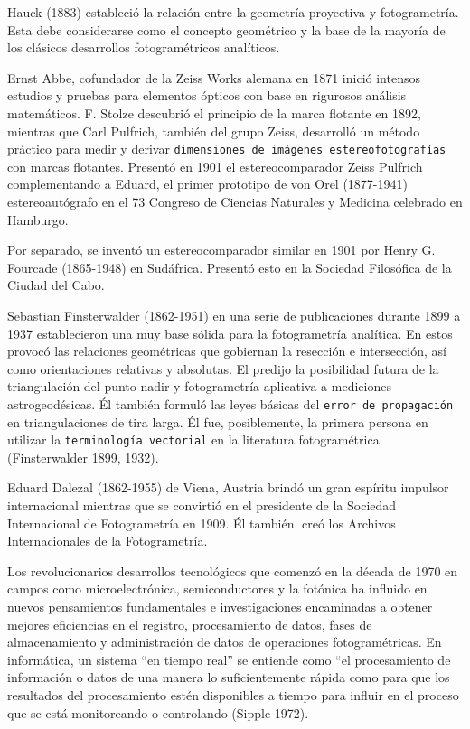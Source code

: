 Hauck (1883) estableció la relación entre la geometría proyectiva y fotogrametría. Esta debe considerarse como el concepto geométrico y la base de la mayoría de los clásicos desarrollos fotogramétricos analíticos.

Ernst Abbe, cofundador de la Zeiss Works alemana en 1871 inició intensos estudios y pruebas para elementos ópticos con base en rigurosos análisis matemáticos. F. Stolze descubrió el principio de la marca flotante en 1892, mientras que Carl Pulfrich, también del grupo Zeiss, desarrolló un método práctico para medir y derivar \texttt{dimensiones de imágenes estereofotografías} con marcas flotantes. Presentó en 1901 el estereocomparador Zeiss Pulfrich complementando a Eduard, el primer prototipo de von Orel (1877-1941) estereoautógrafo en el 73 Congreso de Ciencias Naturales y Medicina celebrado en Hamburgo.

Por separado, se inventó un estereocomparador similar en 1901 por Henry G. Fourcade (1865-1948) en Sudáfrica.  Presentó esto en la Sociedad Filosófica de la Ciudad del Cabo.

Sebastian Finsterwalder (1862-1951) en una serie de
publicaciones durante 1899 a 1937 establecieron una muy
base sólida para la fotogrametría analítica.
En estos provocó las relaciones geométricas
que gobiernan la resección e intersección, así como
orientaciones relativas y absolutas. El predijo
la posibilidad futura de la triangulación del punto nadir
y fotogrametría aplicativa a mediciones astrogeodésicas. Él también formuló las
leyes básicas del \texttt{error de propagación} en triangulaciones de tira larga.
Él fue, posiblemente, la primera persona en utilizar la \texttt{terminología vectorial} en la literatura fotogramétrica (Finsterwalder 1899, 1932).

Eduard Dalezal (1862-1955) de Viena, Austria
brindó un gran espíritu impulsor internacional mientras
que se convirtió en el presidente de la Sociedad Internacional
de Fotogrametría en 1909. Él también.
creó los Archivos Internacionales de la
Fotogrametría.

Los revolucionarios desarrollos tecnológicos que
comenzó en la década de 1970 en campos como
microelectrónica, semiconductores y
la fotónica ha influido en nuevos pensamientos fundamentales
e investigaciones encaminadas a obtener mejores
eficiencias en el registro, procesamiento de datos,
fases de almacenamiento y administración de datos de
operaciones fotogramétricas. En informática,
un sistema ``en tiempo real'' se entiende como ``el
procesamiento de información o datos de una 
manera lo suficientemente rápida como para que 
los resultados del procesamiento estén disponibles
a tiempo para influir en el proceso que se está 
monitoreando o controlando (Sipple 1972).

